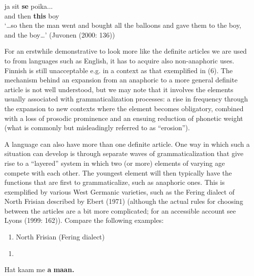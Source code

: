\ea\label{}
\gll ja  sit  \textbf{se} poika...\\


and   then  \textbf{this} boy\\ %


‘…so then the man went and bought all the balloons and gave them to the boy, and the boy…’ (Juvonen (2000: 136))
\z

For an erstwhile demonstrative to look more like the definite articles we are used to from languages such as English, it has to acquire also non-anaphoric uses. Finnish is still unacceptable e.g. in a context as that exemplified in (6). The mechanism behind an expansion from an anaphoric to a more general definite article is not well understood, but we may note that it involves the elements usually associated with grammaticalization processes: a rise in frequency through the expansion to new contexts where the element becomes obligatory, combined with a loss of prosodic prominence and an ensuing reduction of phonetic weight (what is commonly but misleadingly referred to as “erosion”). 

A language can also have more than one definite article. One way in which such a situation can develop is through separate waves of grammaticalization that give rise to a “layered” system in which two (or more) elements of varying age compete with each other. The youngest element will then typically have the functions that are first to grammaticalize, such as anaphoric ones. This is exemplified by various West Germanic varieties, such as the Fering dialect of North Frisian described by Ebert (1971) (although the actual rules for choosing between the articles are a bit more complicated; for an accessible account see Lyons (1999: 162)). Compare the following examples:

\begin{enumerate} %
\item 
North Frisian (Fering dialect)

\end{enumerate} %
\setcounter{listLFOxcviiileveli}{0}
\begin{enumerate} %
\item 
\end{enumerate} %
\ea\label{}
\gll Hat  kaam  me  \textbf{a} \textbf{maan.}\\


